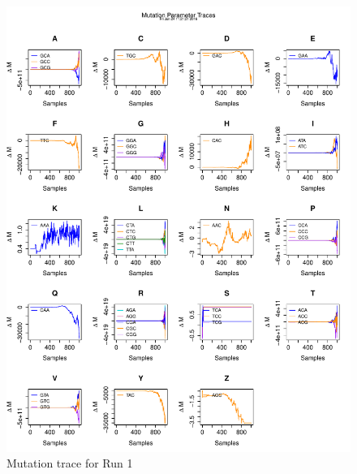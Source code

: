 \documentclass[11pt]{labbook}
\begin{document}
\begin{itemize}
\begin{figure}
        \includegraphics[scale=.65]{FONSE_Plots/2016/June_24/Run1_MutationTrace}
        \caption{Mutation trace for Run 1}
        \label{fig:JUN24_MUT_R1}
    \end{figure}
    \begin{figure}
        \centering

\end{figure}
\end{itemize}
\end{document}
